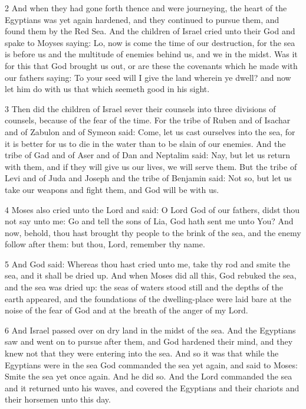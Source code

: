 \par 2 And when they had gone forth thence and were journeying, the heart of the Egyptians was yet again hardened, and they continued to pursue them, and found them by the Red Sea. And the children of Israel cried unto their God and spake to Moyses saying: Lo, now is come the time of our destruction, for the sea is before us and the multitude of enemies behind us, and we in the midst. Was it for this that God brought us out, or are these the covenants which he made with our fathers saying: To your seed will I give the land wherein ye dwell? and now let him do with us that which seemeth good in his sight. 

\par 3 Then did the children of Israel sever their counsels into three divisions of counsels, because of the fear of the time. For the tribe of Ruben and of Isachar and of Zabulon and of Symeon said: Come, let us cast ourselves into the sea, for it is better for us to die in the water than to be slain of our enemies. And the tribe of Gad and of Aser and of Dan and Neptalim said: Nay, but let us return with them, and if they will give us our lives, we will serve them. But the tribe of Levi and of Juda and Joseph and the tribe of Benjamin said: Not so, but let us take our weapons and fight them, and God will be with us. 

\par 4 Moses also cried unto the Lord and said: O Lord God of our fathers, didst thou not say unto me: Go and tell the sons of Lia, God hath sent me unto You? And now, behold, thou hast brought thy people to the brink of the sea, and the enemy follow after them: but thou, Lord, remember thy name. 

\par 5 And God said: Whereas thou hast cried unto me, take thy rod and smite the sea, and it shall be dried up. And when Moses did all this, God rebuked the sea, and the sea was dried up: the seas of waters stood still and the depths of the earth appeared, and the foundations of the dwelling-place were laid bare at the noise of the fear of God and at the breath of the anger of my Lord.

\par 6 And Israel passed over on dry land in the midst of the sea. And the Egyptians saw and went on to pursue after them, and God hardened their mind, and they knew not that they were entering into the sea. And so it was that while the Egyptians were in the sea God commanded the sea yet again, and said to Moses: Smite the sea yet once again. And he did so. And the Lord commanded the sea and it returned unto his waves, and covered the Egyptians and their chariots and their horsemen unto this day.

